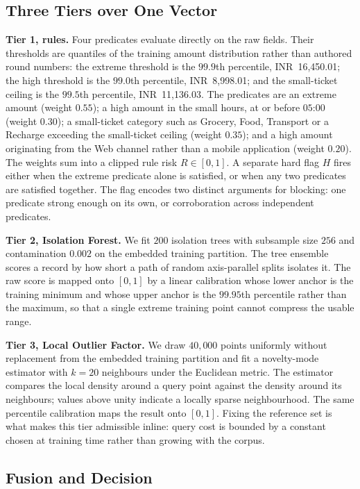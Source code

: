 \documentclass[conference]{IEEEtran}
\newcommand{\INR}[1]{\mbox{INR~#1}}
\begin{document}
\subsection{Three Tiers over One Vector}

\textbf{Tier 1, rules.} Four predicates evaluate directly on the raw
fields. Their thresholds are quantiles of the training amount
distribution rather than authored round numbers: the extreme threshold
is the $99.9$th percentile, \INR{16{,}450.01}; the high threshold is
the $99.0$th percentile, \INR{8{,}998.01}; and the small-ticket ceiling
is the $99.5$th percentile, \INR{11{,}136.03}. The predicates are an extreme
amount (weight $0.55$); a high amount in the small hours, at or before
$05$:$00$ (weight $0.30$); a small-ticket category such as Grocery,
Food, Transport or a Recharge exceeding the small-ticket ceiling
(weight $0.35$); and a high amount originating from the Web channel
rather than a mobile application (weight $0.20$). The weights sum
into a clipped rule risk $R \in [0,1]$. A separate hard flag $H$ fires
either when the extreme predicate alone is satisfied, or when any two
predicates are satisfied together. The flag encodes two distinct
arguments for blocking: one predicate strong enough on its own, or
corroboration across independent predicates.

\textbf{Tier 2, Isolation Forest.} We fit $200$ isolation trees with
subsample size $256$ and contamination $0.002$ on the embedded
training partition. The tree ensemble scores a record by how short a
path of random axis-parallel splits isolates it. The raw score is
mapped onto $[0,1]$ by a linear calibration whose lower anchor is the
training minimum and whose upper anchor is the $99.95$th percentile
rather than the maximum, so that a single extreme training point
cannot compress the usable range.

\textbf{Tier 3, Local Outlier Factor.} We draw $40{,}000$ points
uniformly without replacement from the embedded training partition and
fit a novelty-mode estimator with $k=20$ neighbours under the Euclidean
metric. The estimator compares the local density around a query point
against the density around its neighbours; values above unity indicate
a locally sparse neighbourhood. The same percentile calibration maps
the result onto $[0,1]$. Fixing the reference set is what makes this
tier admissible inline: query cost is bounded by a constant chosen at
training time rather than growing with the corpus.

\subsection{Fusion and Decision}
\end{document}
